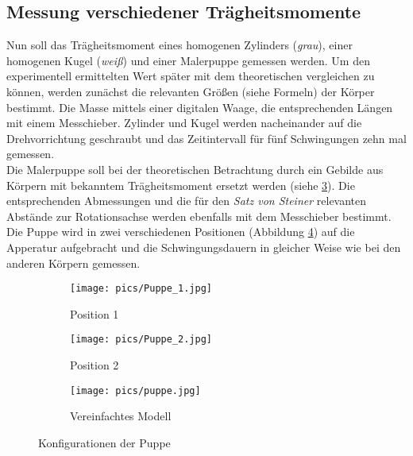 \subsection{Messung verschiedener Trägheitsmomente}
Nun soll das Trägheitsmoment eines homogenen Zylinders (\textit{grau}), einer homogenen Kugel (\textit{weiß}) und einer
Malerpuppe gemessen werden. Um den experimentell ermittelten Wert später mit dem theoretischen
vergleichen zu können, werden zunächst die relevanten Größen (siehe Formeln) der Körper
bestimmt. Die Masse mittels einer digitalen Waage, die entsprechenden Längen mit einem
Messchieber. Zylinder und Kugel werden nacheinander auf die Drehvorrichtung geschraubt und
das Zeitintervall für fünf Schwingungen zehn mal gemessen. \\
Die Malerpuppe soll bei der theoretischen Betrachtung durch ein Gebilde aus Körpern mit
bekanntem Trägheitsmoment ersetzt werden (siehe \ref{fig:pupmod}). Die entsprechenden Abmessungen und die für den \textit{Satz
von Steiner} relevanten Abstände zur Rotationsachse werden ebenfalls mit dem Messchieber bestimmt.
Die Puppe wird in zwei verschiedenen Positionen (Abbildung \ref{fig:konfig}) auf die Apperatur aufgebracht
und die Schwingungsdauern in gleicher Weise wie bei den anderen Körpern gemessen. \\

\begin{figure}
\centering
\begin{subfigure}{0.30\textwidth}
\centering
\texttt{[image: pics/Puppe\_1.jpg]}
\caption{Position 1}
\label{fig:pup1}
\end{subfigure}
\begin{subfigure}{0.30\textwidth}
\centering
\texttt{[image: pics/Puppe\_2.jpg]}
\caption{Position 2}
\label{fig:pup2}
\end{subfigure}
\begin{subfigure}{0.30\textwidth}
\centering
\texttt{[image: pics/puppe.jpg]}
\caption{Vereinfachtes Modell}
\label{fig:pupmod}
\end{subfigure}
\caption{Konfigurationen der Puppe}
\label{fig:konfig}
\end{figure}
